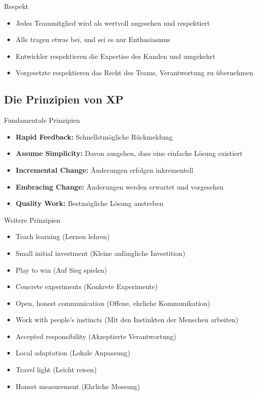 \begin{concept}{Respekt}\\
    \begin{itemize}
        \item Jedes Teammitglied wird als wertvoll angesehen und respektiert
        \item Alle tragen etwas bei, und sei es nur Enthusiasmus
        \item Entwickler respektieren die Expertise des Kunden und umgekehrt
        \item Vorgesetzte respektieren das Recht des Teams, Verantwortung zu übernehmen
    \end{itemize}
\end{concept}

\subsection{Die Prinzipien von XP}

\begin{concept}{Fundamentale Prinzipien}\\
    \begin{itemize}
        \item \textbf{Rapid Feedback:} Schnellstmögliche Rückmeldung
        \item \textbf{Assume Simplicity:} Davon ausgehen, dass eine einfache Lösung existiert
        \item \textbf{Incremental Change:} Änderungen erfolgen inkrementell
        \item \textbf{Embracing Change:} Änderungen werden erwartet und vorgesehen
        \item \textbf{Quality Work:} Bestmögliche Lösung anstreben
    \end{itemize}
\end{concept}

\begin{concept}{Weitere Prinzipien}\\
    \begin{itemize}
        \item Teach learning (Lernen lehren)
        \item Small initial investment (Kleine anfängliche Investition)
        \item Play to win (Auf Sieg spielen)
        \item Concrete experiments (Konkrete Experimente)
        \item Open, honest communication (Offene, ehrliche Kommunikation)
        \item Work with people's instincts (Mit den Instinkten der Menschen arbeiten)
        \item Accepted responsibility (Akzeptierte Verantwortung)
        \item Local adaptation (Lokale Anpassung)
        \item Travel light (Leicht reisen)
        \item Honest measurement (Ehrliche Messung)
    \end{itemize}
\end{concept}

